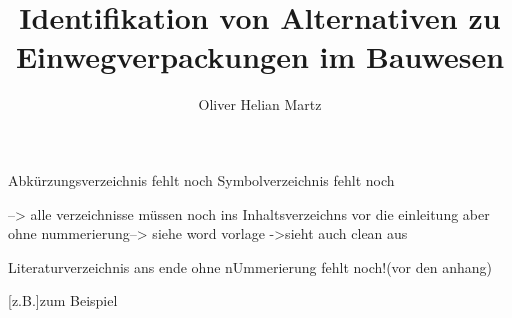 \documentclass[twoside,ngerman]{sdqthesis}
\author{Oliver Helian Martz}
\title{Identifikation von Alternativen zu Einwegverpackungen im Bauwesen}
\begin{document}



\setpdf


\frontmatter

\maketitle



\setcounter{page}{1}




\tableofcontents

\listoffigures
\listoftables

Abkürzungsverzeichnis fehlt noch
Symbolverzeichnis fehlt noch

--> alle verzeichnisse müssen noch ins Inhaltsverzeichns vor die einleitung aber ohne nummerierung--> siehe word vorlage
->sieht auch clean aus

Literaturverzeichnis ans ende ohne nUmmerierung fehlt noch!(vor den anhang)


\mainmatter











\printbibliography[heading=bibintoc]

\appendix


\begin{acronym}

[z.B.]{zum Beispiel}

\end{acronym}
\end{document}
